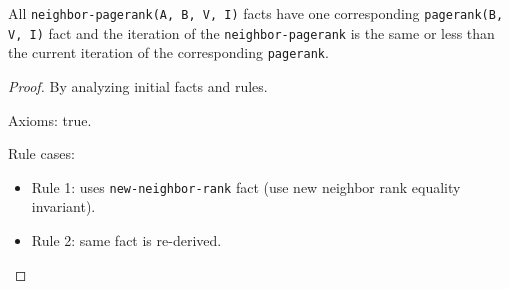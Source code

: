 \begin{invariant}
All \texttt{neighbor-pagerank(A, B, V, I)} facts have one corresponding
\texttt{pagerank(B, V, I)} fact and the iteration of the \texttt{neighbor-pagerank}
is the same or less than the current iteration of the corresponding
\texttt{pagerank}.
\end{invariant}
\begin{proof}
By analyzing initial facts and rules.

Axioms: true.

Rule cases:

\begin{itemize}
   \item Rule 1: uses \texttt{new-neighbor-rank} fact (use new neighbor rank
         equality invariant).
   \item Rule 2: same fact is re-derived.
\end{itemize}
\end{proof}

